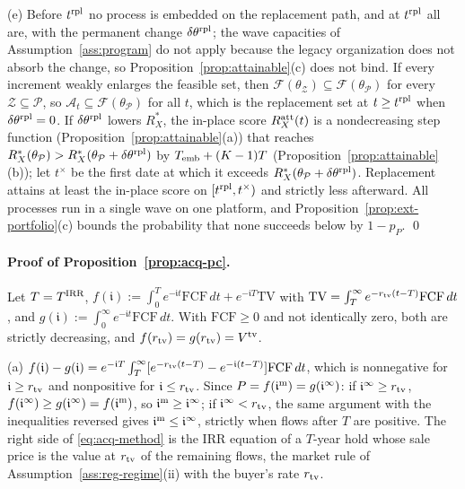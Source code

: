 (e) Before $t^{\rm rpl}$ no process is embedded on the replacement path, and at $t^{\rm rpl}$ all are, with the permanent change $\delta\theta^{\rm rpl}$; the wave capacities of Assumption~\ref{ass:program} do not apply because the legacy organization does not absorb the change, so Proposition~\ref{prop:attainable}(c) does not bind. If every increment weakly enlarges the feasible set, then $\mathcal F(\theta_{\mathcal Z})\subseteq\mathcal F(\theta_{\mathcal P})$ for every $\mathcal Z\subseteq\mathcal P$, so $\mathcal A_t\subseteq\mathcal F(\theta_{\mathcal P})$ for all $t$, which is the replacement set at $t\ge t^{\rm rpl}$ when $\delta\theta^{\rm rpl}=0$. If $\delta\theta^{\rm rpl}$ lowers $R^*_X$, the in-place score $R^{\rm att}_X(t)$ is a nondecreasing step function (Proposition~\ref{prop:attainable}(a)) that reaches $R^*_X(\theta_{\mathcal P})>R^*_X(\theta_{\mathcal P}+\delta\theta^{\rm rpl})$ by $T_{\rm emb}+(K-1)T$ (Proposition~\ref{prop:attainable}(b)); let $t^\times$ be the first date at which it exceeds $R^*_X(\theta_{\mathcal P}+\delta\theta^{\rm rpl})$. Replacement attains at least the in-place score on $[t^{\rm rpl},t^\times)$ and strictly less afterward. All processes run in a single wave on one platform, and Proposition~\ref{prop:ext-portfolio}(c) bounds the probability that none succeeds below by $1-p_P$. \qed

\paragraph{Proof of Proposition~\ref{prop:acq-pc}.}
Let $T=T^{\rm IRR}$, $f(\mathfrak i):=\int_0^Te^{-\mathfrak it}\mathrm{FCF}\,dt+e^{-\mathfrak iT}\mathrm{TV}$ with $\mathrm{TV}=\int_T^\infty e^{-r_{\rm tv}(t-T)}\mathrm{FCF}\,dt$, and $g(\mathfrak i):=\int_0^\infty e^{-\mathfrak it}\mathrm{FCF}\,dt$. With $\mathrm{FCF}\ge0$ and not identically zero, both are strictly decreasing, and $f(r_{\rm tv})=g(r_{\rm tv})=V^{\rm tv}$.

(a) $f(\mathfrak i)-g(\mathfrak i)=e^{-\mathfrak iT}\int_T^\infty[e^{-r_{\rm tv}(t-T)}-e^{-\mathfrak i(t-T)}]\mathrm{FCF}\,dt$, which is nonnegative for $\mathfrak i\ge r_{\rm tv}$ and nonpositive for $\mathfrak i\le r_{\rm tv}$. Since $P=f(\mathfrak i^{\rm m})=g(\mathfrak i^\infty)$: if $\mathfrak i^\infty\ge r_{\rm tv}$, $f(\mathfrak i^\infty)\ge g(\mathfrak i^\infty)=f(\mathfrak i^{\rm m})$, so $\mathfrak i^{\rm m}\ge\mathfrak i^\infty$; if $\mathfrak i^\infty<r_{\rm tv}$, the same argument with the inequalities reversed gives $\mathfrak i^{\rm m}\le\mathfrak i^\infty$, strictly when flows after $T$ are positive. The right side of \eqref{eq:acq-method} is the IRR equation of a $T$-year hold whose sale price is the value at $r_{\rm tv}$ of the remaining flows, the market rule of Assumption~\ref{ass:reg-regime}(ii) with the buyer's rate $r_{\rm tv}$.

